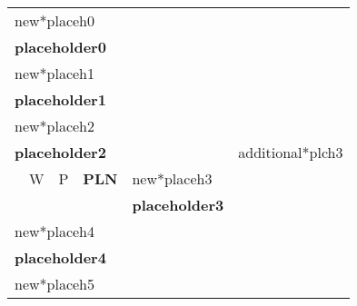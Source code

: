 \documentclass{article}
\begin{document}
\thispagestyle{empty}
\begin{table}[t]
{\setlength{\tabcolsep}{0.5em}
\begin{tabularx}{\textwidth}{|Xccll|c|}
\hline
\multicolumn{5}{|l|}{new*placeh0}                                                                                    & \multirow{22}{*}{ \begin{sideways}additional*plch3\end{sideways}} \\
\multicolumn{5}{|l|}{\textbf{placeholder0}}                                                                                                  &                                             \\
\multicolumn{5}{|l|}{new*placeh1}                                                                                &                                             \\
\multicolumn{5}{|l|}{\textbf{placeholder1}}                                                                                                  &                                             \\ \cline{1-5}
\multicolumn{5}{|l|}{new*placeh2}                                                                              &                                             \\
\multicolumn{5}{|l|}{\textbf{placeholder2}}                                                                                                  &                                             \\ \cline{2-3} \cline{5-5}
 & \multicolumn{1}{|l|}{W}      & \multicolumn{1}{l|}{P}      & \multicolumn{1}{X|}{\centering \textbf{PLN}}      & new*placeh3                    &                                             \\ \cline{2-3}
&                             &                             & \multicolumn{1}{l|}{}                  &  \textbf{placeholder3}                &                                             \\ \cline{1-5}
\multicolumn{5}{|l|}{new*placeh4}                                                                         &                                             \\
\multicolumn{5}{|l|}{\textbf{placeholder4}}                                                                                                  &                                             \\
\multicolumn{5}{|l|}{new*placeh5}                                                                               &                                             \\

\end{tabularx}}
\end{table}
\end{document}
